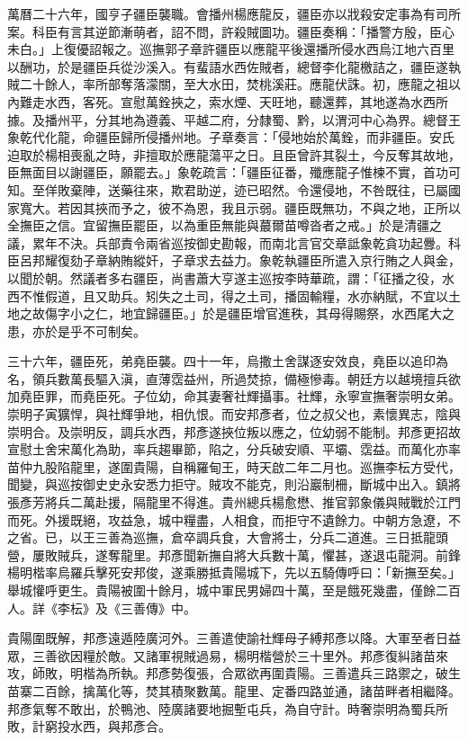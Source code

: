 \begin{pinyinscope}
萬曆二十六年，國亨子疆臣襲職。會播州楊應龍反，疆臣亦以戕殺安定事為有司所案。科臣有言其逆節漸萌者，詔不問，許殺賊圖功。疆臣奏稱：「播警方殷，臣心未白。」上復優詔報之。巡撫郭子章許疆臣以應龍平後還播所侵水西烏江地六百里以酬功，於是疆臣兵從沙溪入。有蜚語水西佐賊者，總督李化龍檄詰之，疆臣遂執賊二十餘人，率所部奪落濛關，至大水田，焚桃溪莊。應龍伏誅。初，應龍之祖以內難走水西，客死。宣慰萬銓挾之，索水煙、天旺地，聽還葬，其地遂為水西所據。及播州平，分其地為遵義、平越二府，分隸蜀、黔，以渭河中心為界。總督王象乾代化龍，命疆臣歸所侵播州地。子章奏言：「侵地始於萬銓，而非疆臣。安氏迫取於楊相喪亂之時，非擅取於應龍蕩平之日。且臣曾許其裂土，今反奪其故地，臣無面目以謝疆臣，願罷去。」象乾疏言：「疆臣征番，殲應龍子惟楝不實，首功可知。至佯敗棄陣，送藥往來，欺君助逆，迹已昭然。令還侵地，不咎既往，已屬國家寬大。若因其挾而予之，彼不為恩，我且示弱。疆臣既無功，不與之地，正所以全撫臣之信。宜留撫臣罷臣，以為重臣無能與蕞爾苗噂沓者之戒。」於是清疆之議，累年不決。兵部責令兩省巡按御史勘報，而南北言官交章詆象乾貪功起釁。科臣呂邦耀復劾子章納賄縱奸，子章求去益力。象乾執疆臣所遣入京行賄之人與金，以聞於朝。然議者多右疆臣，尚書蕭大亨遂主巡按李時華疏，謂：「征播之役，水西不惟假道，且又助兵。矧失之土司，得之土司，播固輸糧，水亦納賦，不宜以土地之故傷字小之仁，地宜歸疆臣。」於是疆臣增官進秩，其母得賜祭，水西尾大之患，亦於是乎不可制矣。

三十六年，疆臣死，弟堯臣襲。四十一年，烏撒土舍謀逐安效良，堯臣以追印為名，領兵數萬長驅入滇，直薄霑益州，所過焚掠，備極慘毒。朝廷方以越境擅兵欲加堯臣罪，而堯臣死。子位幼，命其妻奢社輝攝事。社輝，永寧宣撫奢崇明女弟。崇明子寅獷悍，與社輝爭地，相仇恨。而安邦彥者，位之叔父也，素懷異志，陰與崇明合。及崇明反，調兵水西，邦彥遂挾位叛以應之，位幼弱不能制。邦彥更招故宣慰土舍宋萬化為助，率兵趨畢節，陷之，分兵破安順、平壩、霑益。而萬化亦率苗仲九股陷龍里，遂圍貴陽，自稱羅甸王，時天啟二年二月也。巡撫李枟方受代，聞變，與巡按御史史永安悉力拒守。賊攻不能克，則沿巖制柵，斷城中出入。鎮將張彥芳將兵二萬赴援，隔龍里不得進。貴州總兵楊愈懋、推官郭象儀與賊戰於江門而死。外援既絕，攻益急，城中糧盡，人相食，而拒守不遺餘力。中朝方急遼，不之省。已，以王三善為巡撫，倉卒調兵食，大會將士，分兵二道進。三日抵龍頭營，屢敗賊兵，遂奪龍里。邦彥聞新撫自將大兵數十萬，懼甚，遂退屯龍洞。前鋒楊明楷率烏羅兵擊死安邦俊，遂乘勝抵貴陽城下，先以五騎傳呼曰：「新撫至矣。」舉城懽呼更生。貴陽被圍十餘月，城中軍民男婦四十萬，至是餓死幾盡，僅餘二百人。詳《李枟》及《三善傳》中。

貴陽圍既解，邦彥遠遁陸廣河外。三善遣使諭社輝母子縛邦彥以降。大軍至者日益眾，三善欲因糧於敵。又諸軍視賊過易，楊明楷營於三十里外。邦彥復糾諸苗來攻，師敗，明楷為所執。邦彥勢復張，合眾欲再圍貴陽。三善遣兵三路禦之，破生苗寨二百餘，擒萬化等，焚其積聚數萬。龍里、定番四路並通，諸苗畔者相繼降。邦彥氣奪不敢出，於鴨池、陸廣諸要地掘塹屯兵，為自守計。時奢崇明為蜀兵所敗，計窮投水西，與邦彥合。


\end{pinyinscope}
